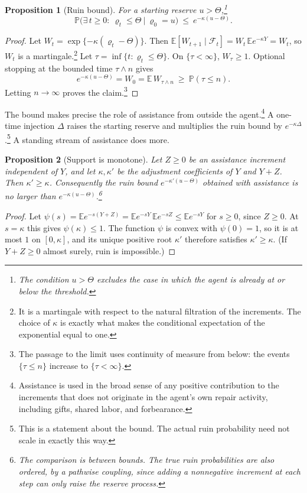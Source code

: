 \documentclass[11pt]{article}
\newtheorem{proposition}{Proposition}
\theoremstyle{remark}
\newcommand{\E}{\mathbb{E}}
\renewcommand{\Pr}{\mathbb{P}}
\begin{document}
\begin{proposition}[Ruin bound]
For a starting reserve $u>\Theta$,\footnote{The condition $u>\Theta$ excludes the case in which the agent is already at or below the threshold.}
\[
\Pr\bigl(\exists\,t\ge 0:\ \varrho_t\le\Theta\ \big|\ \varrho_0=u\bigr)\ \le\ e^{-\kappa(u-\Theta)} .
\]
\end{proposition}

\begin{proof}
Let $W_t=\exp\{-\kappa(\varrho_t-\Theta)\}$. Then $\E[W_{t+1}\mid\mathcal F_t]=W_t\,\E e^{-\kappa Y}=W_t$, so $W_t$ is a martingale.\footnote{It is a martingale with respect to the natural filtration of the increments. The choice of $\kappa$ is exactly what makes the conditional expectation of the exponential equal to one.} Let $\tau=\inf\{t:\varrho_t\le\Theta\}$. On $\{\tau<\infty\}$, $W_\tau\ge1$. Optional stopping at the bounded time $\tau\wedge n$ gives
\[
e^{-\kappa(u-\Theta)}=W_0=\E\,W_{\tau\wedge n}\ \ge\ \Pr(\tau\le n).
\]
Letting $n\to\infty$ proves the claim.\footnote{The passage to the limit uses continuity of measure from below: the events $\{\tau\le n\}$ increase to $\{\tau<\infty\}$.}
\end{proof}

The bound makes precise the role of assistance from outside the agent.\footnote{Assistance is used in the broad sense of any positive contribution to the increments that does not originate in the agent's own repair activity, including gifts, shared labor, and forbearance.} A one-time injection $\Delta$ raises the starting reserve and multiplies the ruin bound by $e^{-\kappa\Delta}$.\footnote{This is a statement about the bound. The actual ruin probability need not scale in exactly this way.} A standing stream of assistance does more.

\begin{proposition}[Support is monotone]
Let $Z\ge0$ be an assistance increment independent of $Y$, and let $\kappa,\kappa'$ be the adjustment coefficients of $Y$ and $Y+Z$. Then $\kappa'\ge\kappa$. Consequently the ruin bound $e^{-\kappa'(u-\Theta)}$ obtained with assistance is no larger than $e^{-\kappa(u-\Theta)}$.\footnote{The comparison is between bounds. The true ruin probabilities are also ordered, by a pathwise coupling, since adding a nonnegative increment at each step can only raise the reserve process.}
\end{proposition}

\begin{proof}
Let $\psi(s)=\E e^{-s(Y+Z)}=\E e^{-sY}\,\E e^{-sZ}\le\E e^{-sY}$ for $s\ge0$, since $Z\ge0$. At $s=\kappa$ this gives $\psi(\kappa)\le1$. The function $\psi$ is convex with $\psi(0)=1$, so it is at most $1$ on $[0,\kappa]$, and its unique positive root $\kappa'$ therefore satisfies $\kappa'\ge\kappa$. (If $Y+Z\ge0$ almost surely, ruin is impossible.)
\end{proof}
\end{document}
